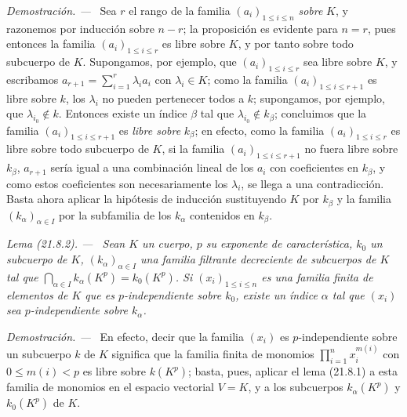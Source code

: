 \documentclass[10pt,oneside]{book}
\makeatletter
\newcommand{\setmanualcurrentlabel}[1]{\def\@currentlabel{#1}}
\newcommand{\oldpage}[2][]{%
  \setcounter{footnote}{0}%
  \marginpar{\scriptsize\textbf{#1}~|~#2}\ignorespaces}
\newenvironment{lemma}[1][]{%
  \setmanualcurrentlabel{#1}\par\medskip\noindent\itshape Lema (#1). ---\ }{\par}
\newenvironment{proof}{%
  \par\medskip\noindent\textit{Demostración. ---\ }}{\par}
\makeatother
\begin{document}
\oldpage[0\textsubscript{IV-1}]{172}
\begin{proof}
Sea $r$ el rango de la familia $(a_i)_{1\leqslant i\leqslant n}$ \emph{sobre} $K$, y
razonemos por inducción sobre $n-r$; la proposición es evidente para $n=r$,
pues entonces la familia $(a_i)_{1\leqslant i\leqslant r}$ es libre sobre $K$, y
por tanto sobre todo subcuerpo de $K$. Supongamos, por ejemplo, que
$(a_i)_{1\leqslant i\leqslant r}$ sea libre sobre $K$, y escribamos
$a_{r+1}=\sum_{i=1}^r\lambda_i a_i$ con $\lambda_i\in K$; como la familia
$(a_i)_{1\leqslant i\leqslant r+1}$ es libre sobre $k$, los $\lambda_i$ no
pueden pertenecer todos a $k$; supongamos, por ejemplo, que
$\lambda_{i_0}\notin k$. Entonces existe un índice $\beta$ tal que
$\lambda_{i_0}\notin k_\beta$; concluimos que la familia
$(a_i)_{1\leqslant i\leqslant r+1}$ es \emph{libre sobre} $k_\beta$; en efecto, como la
familia $(a_i)_{1\leqslant i\leqslant r}$ es libre sobre todo subcuerpo de
$K$, si la familia $(a_i)_{1\leqslant i\leqslant r+1}$ no fuera libre sobre
$k_\beta$, $a_{r+1}$ sería igual a una combinación lineal de los $a_i$ con
coeficientes en $k_\beta$, y como estos coeficientes son necesariamente los
$\lambda_i$, se llega a una contradicción. Basta ahora aplicar la hipótesis de
inducción sustituyendo $K$ por $k_\beta$ y la familia $(k_\alpha)_{\alpha\in I}$
por la subfamilia de los $k_\alpha$ contenidos en $k_\beta$.
\end{proof}

\begin{lemma}[21.8.2]
\label{0.21.8.2-es}
Sean $K$ un cuerpo, $p$ su exponente de característica, $k_0$ un subcuerpo de
$K$, $(k_\alpha)_{\alpha\in I}$ una familia filtrante decreciente de
subcuerpos de $K$ tal que $\bigcap_{\alpha\in I}k_\alpha(K^p)=k_0(K^p)$.
Si $(x_i)_{1\leqslant i\leqslant n}$ es una familia finita de elementos de $K$
que es $p$-independiente sobre $k_0$, existe un índice $\alpha$ tal que $(x_i)$ sea
$p$-independiente sobre $k_\alpha$.
\end{lemma}

\begin{proof}
En efecto, decir que la familia $(x_i)$ es $p$-independiente sobre un subcuerpo $k$
de $K$ significa que la familia finita de monomios
$\prod_{i=1}^n x_i^{m(i)}$ con $0\leqslant m(i)<p$ es libre sobre $k(K^p)$;
basta, pues, aplicar el lema (21.8.1) a esta familia de monomios en el
espacio vectorial $V=K$, y a los subcuerpos $k_\alpha(K^p)$ y $k_0(K^p)$
de $K$.
\end{proof}
\end{document}

